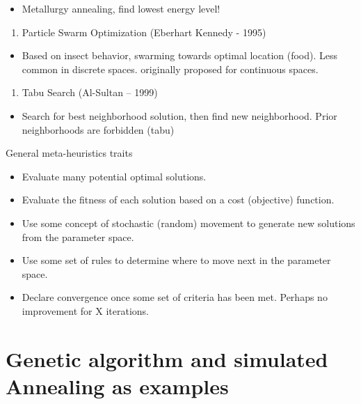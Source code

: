 \documentclass[fontset=fandol,zihao=false,scheme=chinese,heading=true,UTF8]{ctexbook}
\providecommand{\tightlist}{%
  \setlength{\itemsep}{0pt}\setlength{\parskip}{0pt}}
\begin{document}
\begin{itemize}
\tightlist
\item
  Metallurgy annealing, find lowest energy level!
\end{itemize}

\begin{enumerate}
\def\labelenumi{\arabic{enumi}.}
\setcounter{enumi}{2}
\tightlist
\item
  Particle Swarm Optimization (Eberhart Kennedy - 1995)
\end{enumerate}

\begin{itemize}
\tightlist
\item
  Based on insect behavior, swarming towards optimal location (food). Less common in discrete spaces. originally proposed for continuous spaces.
\end{itemize}

\begin{enumerate}
\def\labelenumi{\arabic{enumi}.}
\setcounter{enumi}{3}
\tightlist
\item
  Tabu Search (Al-Sultan -- 1999)
\end{enumerate}

\begin{itemize}
\tightlist
\item
  Search for best neighborhood solution, then find new neighborhood. Prior neighborhoods are forbidden (tabu)
\end{itemize}

General meta-heuristics traits

\begin{itemize}
\tightlist
\item
  Evaluate many potential optimal solutions.
\item
  Evaluate the fitness of each solution based on a cost (objective) function.
\item
  Use some concept of stochastic (random) movement to generate new solutions from the parameter space.
\item
  Use some set of rules to determine where to move next in the parameter space.
\item
  Declare convergence once some set of criteria has been met. Perhaps no improvement for X iterations.
\end{itemize}

\hypertarget{genetic-algorithm-and-simulated-annealing-as-examples}{%
\section{Genetic algorithm and simulated Annealing as examples}\label{genetic-algorithm-and-simulated-annealing-as-examples}}
\end{document}
